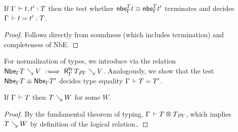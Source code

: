 \documentclass[acmlarge,review,anonymous]{acmart}\settopmatter{printfolios=true}
\begin{document}
\begin{corollary}
  If\/ $\Gamma \,\vdash t,t' : T$ then the test whether $\mathsf{nbe}_{\Gamma}^{T} t \equiv \mathsf{nbe}_{\Gamma}^{T}{t'}$
  terminates and
  decides $\Gamma \,\vdash t = t' : T$.
\end{corollary}
\begin{proof}
  Follows directly from soundness (which includes termination) and completeness of NbE.
\end{proof}

For normalization of types, we introduce 
via the relation $\mathsf{Nbe}_{\Gamma} T \searrow V \mathrel{\ :\Longleftrightarrow\ } \mathsf{R}^{\mathsf{ty}}_{\Gamma} \, T\rho_\Gamma \searrow V$.
Analogously, we show that the test $\mathsf{Nbe}_{\Gamma} T \equiv \mathsf{Nbe}_{\Gamma} T'$
decides type equality $\Gamma \,\vdash T = T'$.

\begin{corollary}
  If $\Gamma \,\vdash T$ then $T \searrow W$ for some $W$.
\end{corollary}
\begin{proof}
  By the fundamental theorem of typing, $\RG \Gamma T {T\rhog}$,
  which implies $T \searrow W$ by definition of the logical relation..
\end{proof}
\end{document}
